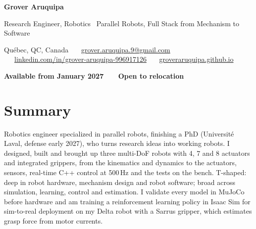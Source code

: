 \documentclass[10pt,a4paper]{article}
\begin{document}
{\LARGE\bfseries Grover Aruquipa}\par\vspace{2pt}
{\large Research Engineer, Robotics \textbar\ Parallel Robots, Full Stack from Mechanism to Software}\par\vspace{3pt}
{\small Qu\'ebec, QC, Canada \ \textbullet\ \
\href{mailto:grover.aruquipa.9@gmail.com}{grover.aruquipa.9@gmail.com} \ \textbullet\ \
\href{https://www.linkedin.com/in/grover-aruquipa-996917126}{linkedin.com/in/grover-aruquipa-996917126} \ \textbullet\ \
\href{https://groveraruquipa.github.io}{groveraruquipa.github.io}}\par\vspace{1pt}
{\small\bfseries Available from January 2027 \ \textbullet\ \ Open to relocation}\par


\section{Summary}
Robotics engineer specialized in parallel robots, finishing a PhD (Universit\'e Laval, defense early 2027), who turns
research ideas into working robots. I designed, built and brought up three multi-DoF robots with 4, 7 and 8 actuators and integrated grippers,
from the kinematics and dynamics to the actuators, sensors, real-time C++ control at 500\,Hz and the tests on the bench.
T-shaped: deep in robot hardware, mechanism design and robot software; broad across simulation, learning, control and
estimation. I validate every model in MuJoCo before hardware and am training a reinforcement learning policy in Isaac Sim
for sim-to-real deployment on my Delta robot with a Sarrus gripper, which estimates grasp force from motor currents.

\end{document}

